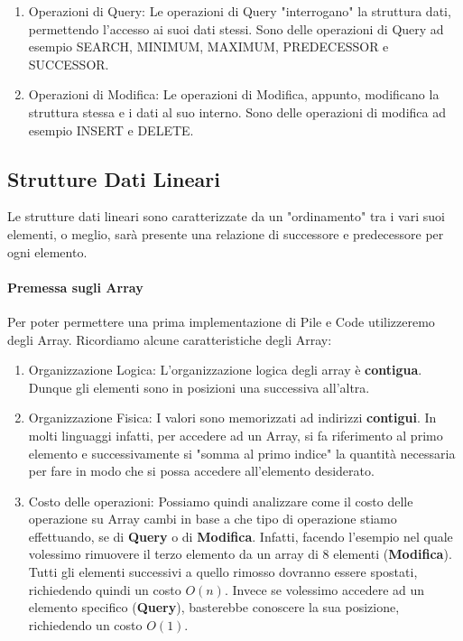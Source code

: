 \documentclass{article}
\begin{document}
\begin{enumerate}
    \item Operazioni di Query: Le operazioni di Query "interrogano" la struttura dati, permettendo l'accesso ai suoi dati stessi. Sono delle operazioni di Query ad esempio SEARCH, MINIMUM, MAXIMUM, PREDECESSOR e SUCCESSOR.
    \item Operazioni di Modifica: Le operazioni di Modifica, appunto, modificano la struttura stessa e i dati al suo interno. Sono delle operazioni di modifica ad esempio INSERT e DELETE.
\end{enumerate}

\subsection{Strutture Dati Lineari}

Le strutture dati lineari sono caratterizzate da un "ordinamento" tra i vari suoi elementi, o meglio, sarà presente una relazione di successore e predecessore per ogni elemento.

\paragraph{Premessa sugli Array} Per poter permettere una prima implementazione di Pile e Code utilizzeremo degli Array. Ricordiamo alcune caratteristiche degli Array:
\begin{enumerate}
    \item Organizzazione Logica: L'organizzazione logica degli array è \textbf{contigua}. Dunque gli elementi sono in posizioni una successiva all'altra.
    \item Organizzazione Fisica: I valori sono memorizzati ad indirizzi \textbf{contigui}. In molti linguaggi infatti, per accedere ad un Array, si fa riferimento al primo elemento e successivamente si "somma al primo indice" la quantità necessaria per fare in modo che si possa accedere all'elemento desiderato.
    \item Costo delle operazioni: Possiamo quindi analizzare come il costo delle operazione su Array cambi in base a che tipo di operazione stiamo effettuando, se di \textbf{Query} o di \textbf{Modifica}. Infatti, facendo l'esempio nel quale volessimo rimuovere il terzo elemento da un array di 8 elementi (\textbf{Modifica}). Tutti gli elementi successivi a quello rimosso dovranno essere spostati, richiedendo quindi un costo \(O(n)\). Invece se volessimo accedere ad un elemento specifico (\textbf{Query}), basterebbe conoscere la sua posizione, richiedendo un costo $O(1)$.
\end{enumerate}
\end{document}

